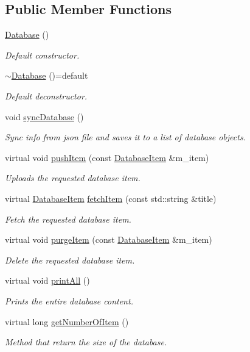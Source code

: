 \subsection*{Public Member Functions}
\begin{DoxyCompactItemize}
\item 
\hyperlink{classDatabase_a4703c80e6969d33565ea340f768fdadf}{Database} ()
\begin{DoxyCompactList}\small\item\em Default constructor. \end{DoxyCompactList}\item 
\hyperlink{classDatabase_a341cd0fe8c615e829e3a22b74c208bb5}{$\sim$\+Database} ()=default
\begin{DoxyCompactList}\small\item\em Default deconstructor. \end{DoxyCompactList}\item 
void \hyperlink{classDatabase_ac77c61314a54bf3bc1bcbcf7986998e8}{sync\+Database} ()
\begin{DoxyCompactList}\small\item\em Sync info from json file and saves it to a list of database objects. \end{DoxyCompactList}\item 
virtual void \hyperlink{classDatabase_a80fa14ab9f4deadc9a2ab7493f1919a4}{push\+Item} (const \hyperlink{classDatabaseItem}{Database\+Item} \&m\+\_\+item)
\begin{DoxyCompactList}\small\item\em Uploads the requested database item. \end{DoxyCompactList}\item 
virtual \hyperlink{classDatabaseItem}{Database\+Item} \hyperlink{classDatabase_a40254eec69c7d7cc15da24a9f0b072b3}{fetch\+Item} (const std\+::string \&title)
\begin{DoxyCompactList}\small\item\em Fetch the requested database item. \end{DoxyCompactList}\item 
virtual void \hyperlink{classDatabase_a5d232b9f62079682dd7fe7983b252e5e}{purge\+Item} (const \hyperlink{classDatabaseItem}{Database\+Item} \&m\+\_\+item)
\begin{DoxyCompactList}\small\item\em Delete the requested database item. \end{DoxyCompactList}\item 
virtual void \hyperlink{classDatabase_afa345da530fd5c8dfe0c978917cd6049}{print\+All} ()
\begin{DoxyCompactList}\small\item\em Prints the entire database content. \end{DoxyCompactList}\item 
virtual long \hyperlink{classDatabase_a230225cb341eb23a99a83ef3d1abae53}{get\+Number\+Of\+Item} ()
\begin{DoxyCompactList}\small\item\em Method that return the size of the database. \end{DoxyCompactList}\end{DoxyCompactItemize}
